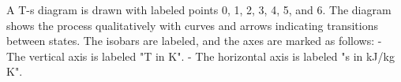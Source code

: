 A T-s diagram is drawn with labeled points 0, 1, 2, 3, 4, 5, and 6. The diagram shows the process qualitatively with curves and arrows indicating transitions between states. The isobars are labeled, and the axes are marked as follows:  
- The vertical axis is labeled "T in K".  
- The horizontal axis is labeled "s in kJ/kg K".